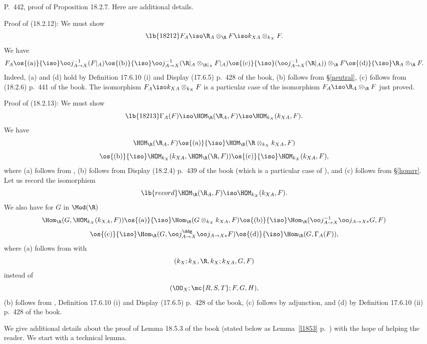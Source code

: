 \documentclass[12pt]{article}
\theoremstyle{remark}
\theoremstyle{definition}
\begin{document}
\begin{s}
P.~442, proof of Proposition 18.2.7. Here are additional details. 

Proof of (18.2.12): We must show 
\begin{equation}\lb{18212}
F_A\iso\R_A\otimes_\R F\iso k_{XA}\otimes_{k_X}F. 
\end{equation} 
We have 
$$
F_A\os{(\text a)}{\iso}
\oo j_{A\to X}^{-1}(F|_A)\os{(\text b)}{\iso}
\oo j_{A\to X}^{-1}(\R|_A\otimes_{\R|_A}F|_A)\os{(\text c)}{\iso}
(\oo j_{A\to X}^{-1}(\R|_A))\otimes_\R F\os{(\text d)}{\iso} 
\R_A\otimes_\R F.
$$ 
Indeed, (a) and (d) hold by Definition 17.6.10 (i) and Display (17.6.5) p.~428 of the book, (b) follows from \S\ref{neutral}, (c) follows from (18.2.6) p.~441 of the book. The isomorphism $F_A\iso k_{XA}\otimes_{k_X}F$ is a particular case of the isomorphism $F_A\iso\R_A\otimes_\R F$ just proved. 

Proof of (18.2.13): We must show 
\begin{equation}\lb{18213} 
\Gamma_A(F)\iso\HOM_\R(\R_A,F)\iso\HOM_{k_X}(k_{XA},F). 
\end{equation}
We have 
$$
\HOM_\R(\R_A,F)\os{(\text a)}{\iso}
\HOM_\R(\R\otimes_{k_X}k_{XA},F)
$$
$$
\os{(\text b)}{\iso}
\HOM_{k_X}(k_{XA},\HOM_\R(\R,F))\os{(\text c)}{\iso}
\HOM_{k_X}(k_{XA},F), 
$$ 
where (a) follows from , (b) follows from Display (18.2.4) p.~439 of the book (which is a particular case of ), and (c) follows from \S\ref{homrr}. Let us record the isomorphism 
\begin{equation}\lb{record}
\HOM_\R(\R_A,F)\iso\HOM_{k_X}(k_{XA},F). 
\end{equation} 
We also have for $G$ in $\Mod(\R)$ 
$$
\Hom_\R(G,\HOM_{k_X}(k_{XA},F))\os{(\text a)}{\iso}
\Hom_\R(G\otimes_{k_X}k_{XA},F)\os{(\text b)}{\iso}
\Hom_\R(\oo j_{A\to X}^{-1}\oo j_{A\to X*}G,F)
$$
$$
\os{(\text c)}{\iso}
\Hom_\R(G,\oo j_{A\to X}^\ddg\oo j_{A\to X*}F)\os{(\text d)}{\iso}
\Hom_\R(G,\Gamma_A(F)), 
$$ 
where (a) follows from  with 
$$
(k_X;k_X,\R,k_X;k_{XA},G,F)
$$ 
instead of 
$$
(\OO_X;\mc{R,S,T};F,G,H),
$$ 
(b) follows from , Definition 17.6.10 (i) and Display (17.6.5) p.~428 of the book, (c) follows by adjunction, and (d) by Definition 17.6.10 (ii) p.~428 of the book. 
\end{s} 



We give additional details about the proof of Lemma 18.5.3 of the book (stated below as Lemma~\ref{l1853} p.~) with the hope of helping the reader. We start with a technical lemma.
\end{document}
